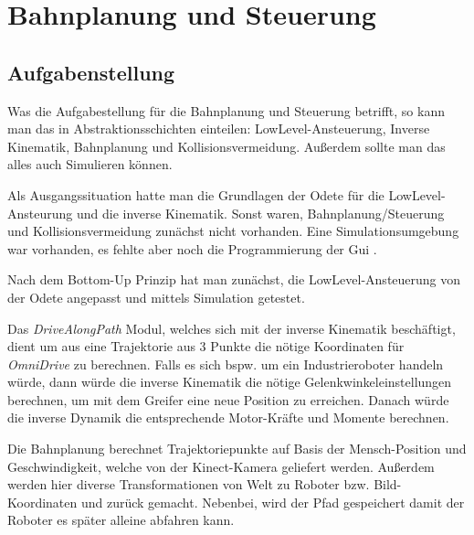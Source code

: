 \chapter{Bahnplanung und Steuerung}
\label{bahnplanung_steuerung_cha}

\section{Aufgabenstellung}
\label{bahnplanung_aufgabenstellung_sec}
\authorsection{\editoroier}

Was die Aufgabestellung für die Bahnplanung und Steuerung betrifft, so kann man das in Abstraktionsschichten einteilen:
LowLevel-Ansteuerung, Inverse Kinematik, Bahnplanung und Kollisionsvermeidung.
Außerdem sollte man das alles auch Simulieren können.

Als Ausgangssituation hatte man die Grundlagen der Odete für die LowLevel-Ansteurung und die inverse Kinematik. Sonst waren, Bahnplanung/Steuerung und Kollisionsvermeidung zunächst nicht vorhanden. Eine Simulationsumgebung war vorhanden, es fehlte aber noch die Programmierung der Gui .

Nach dem Bottom-Up Prinzip hat man zunächst, die LowLevel-Ansteuerung von der Odete angepasst und mittels Simulation getestet.


Das \textit{DriveAlongPath} Modul, welches sich mit der inverse Kinematik beschäftigt, dient um aus eine Trajektorie aus 3 Punkte die nötige Koordinaten für \textit{OmniDrive} zu berechnen.
Falls es sich bspw. um ein Industrieroboter handeln würde, dann würde die inverse Kinematik die nötige Gelenkwinkeleinstellungen berechnen, um mit dem Greifer eine neue Position zu erreichen.
Danach würde die inverse Dynamik die entsprechende Motor-Kräfte und Momente berechnen.

Die Bahnplanung berechnet Trajektoriepunkte auf Basis der Mensch-Position und Geschwindigkeit, welche von der Kinect-Kamera geliefert werden.
Außerdem werden hier diverse Transformationen von Welt zu Roboter bzw. Bild-Koordinaten und zurück gemacht.
Nebenbei, wird der Pfad gespeichert damit der Roboter es später alleine abfahren kann.


